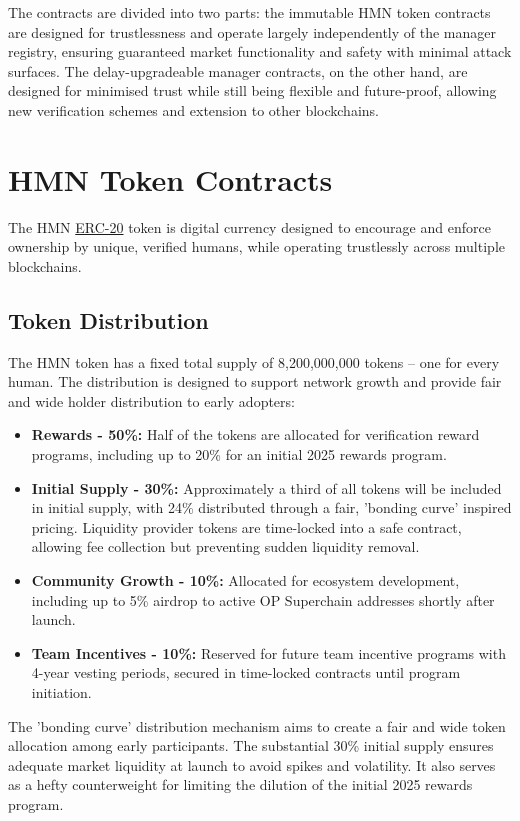 \documentclass[12pt,a4paper]{article}
\begin{document}
The contracts are divided into two parts: the immutable HMN token contracts are designed for trustlessness and operate largely independently of the manager registry, ensuring guaranteed market functionality and safety with minimal attack surfaces.
The delay-upgradeable manager contracts, on the other hand, are designed for minimised trust while still being flexible and future-proof, allowing new verification schemes and extension to other blockchains.

\section{HMN Token Contracts}
The HMN \href{https://ethereum.org/en/developers/docs/standards/tokens/erc-20/}{ERC-20} token is digital currency designed to encourage and enforce ownership by unique, verified humans, while operating trustlessly across multiple blockchains.

\subsection{Token Distribution}
The HMN token has a fixed total supply of 8,200,000,000 tokens -- one for every human. The distribution is designed to support network growth and provide fair and wide holder distribution to early adopters:

\begin{itemize}
    \item \textbf{Rewards - 50\%:} Half of the tokens are allocated for verification reward programs, including up to 20\% for an initial 2025 rewards program.
    \item \textbf{Initial Supply - 30\%:} Approximately a third of all tokens will be included in initial supply, with 24\% distributed through a fair, 'bonding curve' inspired pricing. Liquidity provider tokens are time-locked into a safe contract, allowing fee collection but preventing sudden liquidity removal.
    \item \textbf{Community Growth - 10\%:} Allocated for ecosystem development, including up to 5\% airdrop to active OP Superchain addresses shortly after launch.
    \item \textbf{Team Incentives - 10\%:} Reserved for future team incentive programs with 4-year vesting periods, secured in time-locked contracts until program initiation.
\end{itemize}

The 'bonding curve' distribution mechanism aims to create a fair and wide token allocation among early participants.
The substantial 30\% initial supply ensures adequate market liquidity at launch to avoid spikes and volatility. It also serves as a hefty counterweight for limiting the dilution of the initial 2025 rewards program.
\end{document}
